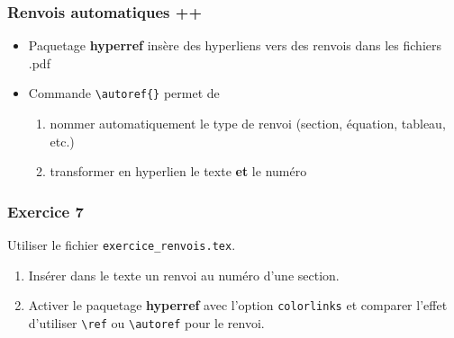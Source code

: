 \begin{frame}[c,fragile]

	\frametitle{Renvois automatiques ++}
	
	\begin{itemize}
		\item Paquetage \textbf{hyperref} insère des hyperliens vers des renvois dans les fichiers
		.pdf
		\item Commande \lstinline|\autoref{}| permet de
		
			\begin{enumerate}
				\item nommer automatiquement le type de renvoi (section, équation, tableau, etc.)
				\item transformer en hyperlien le texte \textbf{et} le numéro
			\end{enumerate}
	\end{itemize}
\end{frame}


\begin{frame}[c,fragile]

	\frametitle{Exercice 7}	
	Utiliser le fichier \texttt{exercice\_renvois.tex}.
	
	\begin{enumerate}
		\item Insérer dans le texte un renvoi au numéro d’une section.
		\item Activer le paquetage \textbf{hyperref} avec l’option \texttt{colorlinks} et comparer l’effet d’utiliser \lstinline|\ref| ou \lstinline|\autoref| pour le renvoi.
	\end{enumerate}
\end{frame}